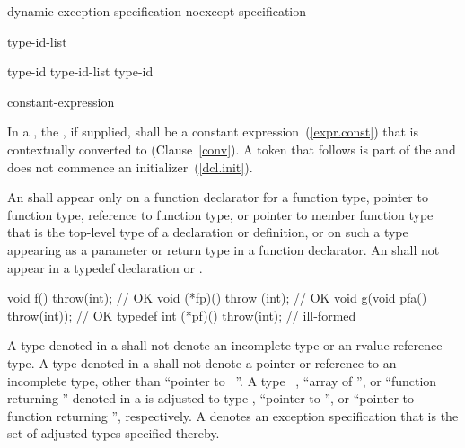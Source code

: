 \begin{bnf}
\br
    dynamic-exception-specification\br
    noexcept-specification
\end{bnf}

\begin{bnf}
\br
     type-id-list\opt \terminal{)}
\end{bnf}

\begin{bnf}
\br
    type-id \opt\br
    type-id-list \terminal{,} type-id \opt
\end{bnf}

\begin{bnf}
\br
     \terminal{(} constant-expression \terminal{)}\br
\end{bnf}

%
In a , the ,
if supplied, shall be a constant expression~(\ref{expr.const}) that is contextually
converted to  (Clause~\ref{conv}).
A \tcode{(} token that follows  is part of the
 and does not commence an
initializer~(\ref{dcl.init}).

\pnum
An
shall appear only on a function declarator for a function type,
pointer to function type, reference to function type, or pointer to
member function type that is the top-level type of a declaration or
definition, or on such a type appearing as a parameter or return type
in a function declarator.
An
shall not appear in a typedef declaration or .
\enterexample
\begin{codeblock}
void f() throw(int);                    // OK
void (*fp)() throw (int);               // OK
void g(void pfa() throw(int));          // OK
typedef int (*pf)() throw(int);         // ill-formed
\end{codeblock}

\exitexample

%
A type denoted
in a 
shall not denote an incomplete type or an rvalue reference type.
A type denoted
in a 
shall not denote a pointer or reference to an incomplete type, other than
``pointer to \cv\ ''.
A type
\cv\ ,
``array of '', or
``function returning ''
denoted in a 
is adjusted to type ,
``pointer to '', or ``pointer to function returning '', respectively.
A 
denotes an exception specification
that is the set of adjusted types specified thereby.


